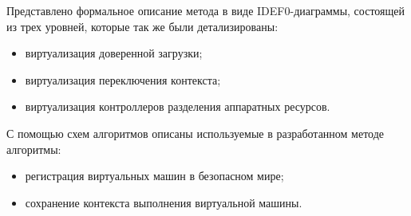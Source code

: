 Представлено формальное описание метода в виде IDEF0-диаграммы, состоящей из трех уровней, которые так же были детализированы:

\begin{itemize}
	\item виртуализация доверенной загрузки;
	\item виртуализация переключения контекста;
	\item виртуализация контроллеров разделения аппаратных ресурсов.
\end{itemize}

С помощью схем алгоритмов описаны используемые в разработанном методе алгоритмы:

\begin{itemize}
	\item регистрация виртуальных машин в безопасном мире;
	\item сохранение контекста выполнения виртуальной машины.
\end{itemize}

\pagebreak
